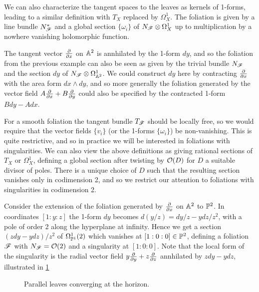 We can also characterize the tangent spaces to the leaves as kernels of 1-forms,
leading to a similar definition with $T_X$ replaced by $\Omega^1_X$. The
foliation is given by a line bundle $N_\scrF^*$ and a global section
$\{\omega_i\}$ of $N_\scrF\otimes\Omega^1_X$ up to multiplication by a nowhere
vanishing holomorphic function.

\begin{example}
    The tangent vector $\pdv{}{x}$ on $\A^2$ is annhilated by the 1-form $dy$,
    and so the foliation from the previous example can also be seen as given by
    the trivial bundle $N_\scrF$ and the section $dy$ of
    $N_\scrF\otimes\Omega^1_{\A^2}$. We could construct $dy$ here by contracting
    $\pdv{}{x}$ with the area form $dx\wedge dy$, and so more generally the
    foliation generated by the vector field $A\pdv{}{x}+B\pdv{}{y}$ could also
    be specified by the contracted 1-form $Bdy-Adx$.
\end{example}

For a smooth foliation the tangent bundle $T_\scrF$ should be locally free, so
we would require that the vector fields $\{v_i\}$ (or the 1-forms
$\{\omega_i\}$) be non-vanishing. This is quite restrictive, and so in practice
we will be interested in foliations with singularities. We can also view the
above definitions as giving rational sections of $T_X$ or $\Omega^1_X$, defining
a global section after twisting by $\O(D)$ for $D$ a suitable divisor of poles.
There is a unique choice of $D$ such that the resulting section vanishes only in
codimension 2, and so we restrict our attention to foliations with singularities
in codimension 2.

\begin{example}
    Consider the extension of the foliation generated by $\pdv{}{x}$ on $\A^2$
    to $\P^2$. In coordinates $[1:y:z]$ the 1-form $dy$ becomes
    $d(y/z)=dy/z-ydz/z^2$, with a pole of order 2 along the hyperplane at
    infinity. Hence we get a section $(zdy-ydz)/z^2$ of $\Omega^1_{\P^1}(2)$
    which vanishes at $[1:0:0]\in\P^2$, defining a foliation $\scrF$ with
    $N_\scrF=\O(2)$ and a singularity at $[1:0:0]$. Note that the local form of
    the singularity is the radial vector field $y\pdv{}{y}+z\pdv{}{z}$
    annhilated by $zdy-ydz$, illustrated in \cref{fig:parallel}
    \begin{figure}[H]
        \centering
        \caption{Parallel leaves converging at the horizon.}
        \label{fig:parallel}
    \end{figure}
\end{example}


